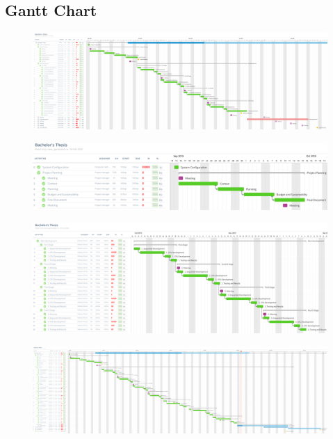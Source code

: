 \documentclass[titlepage,12pt]{article}
\begin{document}
\subsection{Gantt Chart}

\uselandscape

\begin{figure}[H]
	\centering
	\includegraphics[scale=0.30]{media/final_gantt_esp.png}
	\label{gantt_esp}
\end{figure}

\begin{figure}[H]
	\centering
  	\includegraphics[scale=0.25]{media/gantt_gep.png}
  	\label{gantt_1}
\end{figure}

\begin{figure}[H]
	\centering
  	\includegraphics[scale=0.25]{media/gantt_dev_esp.png}
  	\label{gantt_2}
\end{figure}

\begin{figure}[H]
	\centering
	\includegraphics[scale=0.30]{media/final_gantt_eng.png}
	\label{gantt_eng}
\end{figure}
\end{document}
